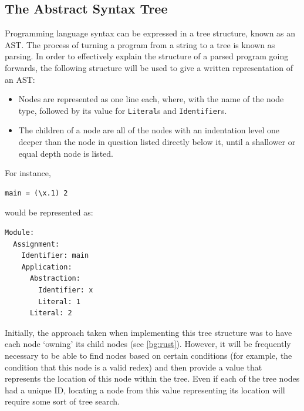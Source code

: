 \subsection{The Abstract Syntax Tree}

Programming language syntax can be expressed in a tree structure, known as an \ac{AST}. The process of turning a program from a string to a tree is known as parsing. In order to effectively explain the structure of a parsed program going forwards, the following structure will be used to give a written representation of an \ac{AST}:
\begin{itemize}
    \item Nodes are represented as one line each, where, with the name of the node type, followed by its value for \verb|Literal|s and \verb|Identifier|s.
    \item The children of a node are all of the nodes with an indentation level one deeper than the node in question listed directly below it, until a shallower or equal depth node is listed. 
\end{itemize}

\noindent
For instance, 
\begin{lstlisting}
main = (\x.1) 2
\end{lstlisting}
would be represented as:
\begin{lstlisting}
Module:
  Assignment:
    Identifier: main
    Application:
      Abstraction:
        Identifier: x
        Literal: 1
      Literal: 2
\end{lstlisting}
Initially, the approach taken when implementing this tree structure was to have each node `owning' its child nodes (see \ref{bg:rust}). However, it will be frequently necessary to be able to find nodes based on certain conditions (for example, the condition that this node is a valid redex) and then provide a value that represents the location of this node within the tree. Even if each of the tree nodes had a unique ID, locating a node from this value representing its location will require some sort of tree search.

